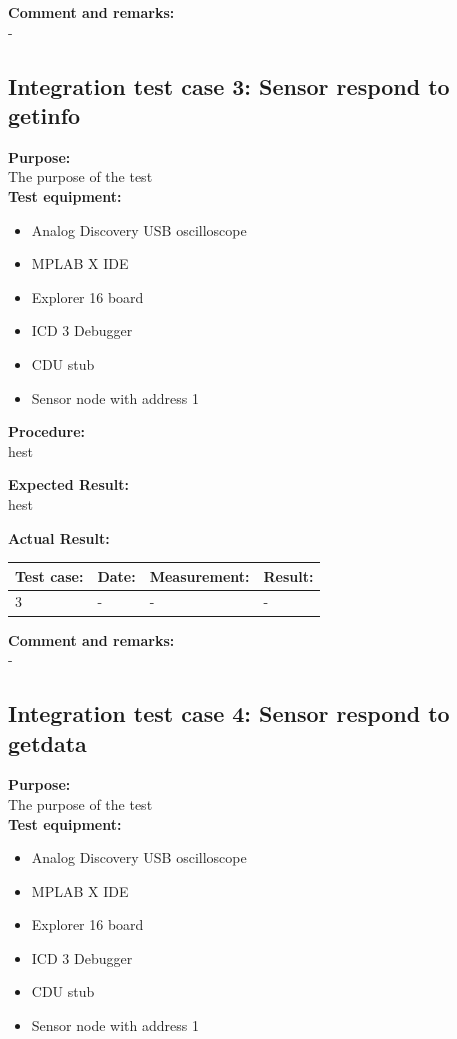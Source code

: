 \textbf{Comment and remarks:}\\
-\\

\subsection{Integration test case 3: Sensor respond to getinfo}
\textbf{Purpose:}\\
The purpose of the test\\

\textbf{Test equipment:}
\begin{itemize}
\item Analog Discovery USB oscilloscope
\item MPLAB X IDE
\item Explorer 16 board
\item ICD 3 Debugger
\item CDU stub
\item Sensor node with address 1
\end{itemize}

\textbf{Procedure:}\\
hest

\textbf{Expected Result:}\\
hest

\textbf{Actual Result:}\\
\begin{table}[H]
\centering
\begin{tabular}{|p{2cm}|p{2cm}|p{3cm}|p{2cm}|}\hline
\textbf{Test case:} & \textbf{Date:} & \textbf{Measurement:} & \textbf{Result:} \\ \hline
3 & - & - & - \\ \hline
\end{tabular}
\end{table}


\textbf{Comment and remarks:}\\
-\\

\subsection{Integration test case 4: Sensor respond to getdata}
\textbf{Purpose:}\\
The purpose of the test\\

\textbf{Test equipment:}
\begin{itemize}
\item Analog Discovery USB oscilloscope
\item MPLAB X IDE
\item Explorer 16 board
\item ICD 3 Debugger
\item CDU stub
\item Sensor node with address 1
\end{itemize}

